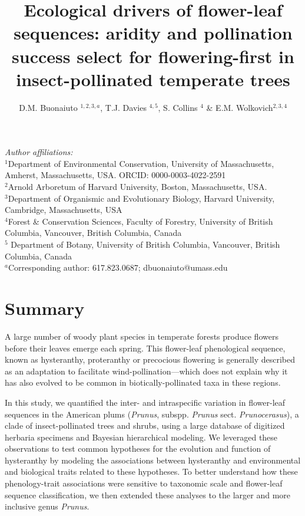 \documentclass{article}[12pt]
\title{Ecological drivers of flower-leaf sequences: aridity and pollination success select for flowering-first in insect-pollinated temperate trees}
\author{D.M. Buonaiuto $^{1,2,3,a}$, T.J. Davies $^{4,5}$, S. Collins $^{4}$ \& E.M. Wolkovich$^{2,3,4}$}
\date{}
\begin{document}

\maketitle
\noindent \emph{Author affiliations:}\\
\noindent $^1$Department of Environmental Conservation, University of Massachusetts, Amherst, Massachusetts, USA. ORCID: 0000-0003-4022-2591\\
\noindent 
$^2$Arnold Arboretum of Harvard University, Boston, Massachusetts, USA.\\
$^3$Department of Organismic and Evolutionary Biology, Harvard University, Cambridge, Massachusetts, USA \\
$^4$Forest \& Conservation Sciences, Faculty of Forestry, University of British Columbia, Vancouver, British Columbia, Canada\\
$^5$ Department of Botany, University of British Columbia, Vancouver, British Columbia, Canada\\
$^a$Corresponding author: 617.823.0687; dbuonaiuto@umass.edu\\

\pagebreak

\section*{Summary} %
A large number of woody plant species in temperate forests produce flowers before their leaves emerge each spring. This flower-leaf phenological sequence, known as hysteranthy, proteranthy or precocious flowering is generally described as an adaptation to facilitate wind-pollination---which does not explain why it has also evolved to be common in biotically-pollinated taxa in these regions. 

In this study, we quantified the inter- and intraspecific variation in flower-leaf sequences in the American plums (\emph{Prunus}, subspp. \emph{Prunus} sect. \emph{Prunocerasus}), a clade of insect-pollinated trees and shrubs, using a large database of digitized herbaria specimens and Bayesian hierarchical modeling. We leveraged these observations to test common hypotheses for the evolution and function of hysteranthy by modeling the associations between hysteranthy and environmental and biological traits related to these hypotheses. To better understand how these phenology-trait associations were sensitive to taxonomic scale and flower-leaf sequence classification, we then extended these analyses to the larger and more inclusive genus \emph{Prunus}. %
\end{document}
